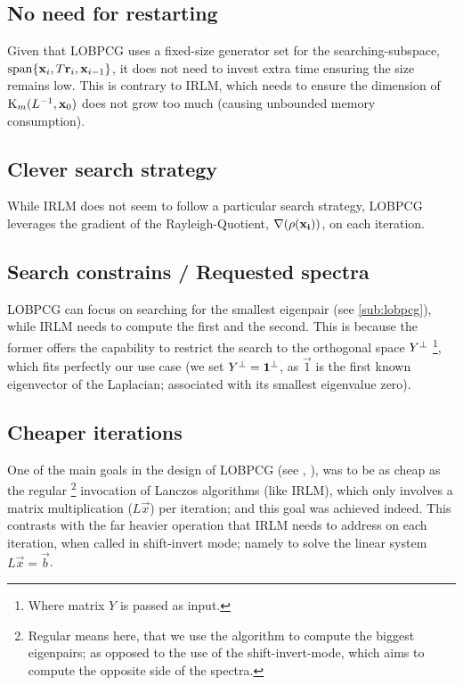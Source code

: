 \subsection{No need for restarting}

Given that \gls{LOBPCG} uses a fixed-size generator set for the
searching-subspace, $\func{span} \{\vec{x}_i, T\vec{r}_i,
\vec{x}_{i-1}\}$, it does not need to invest extra time ensuring the
size remains low. This is contrary to \gls{IRLM}, which needs to
ensure the dimension of $\Krylov{\inv{L}}{\vec{x}_0}{m}$ does not grow
too much (causing unbounded memory consumption).

\subsection{Clever search strategy}

While \gls{IRLM} does not seem to follow a particular search strategy,
\gls{LOBPCG} leverages the gradient of the Rayleigh-Quotient, $\nabla
(\func{\rho}(\vec{x_i}))$, on each iteration.

\subsection{Search constrains / Requested spectra}

\gls{LOBPCG} can focus on searching for the smallest eigenpair (see
\cref{sub:lobpcg}), while \gls{IRLM} needs to compute the first and the
second. This is because the former offers the capability to restrict
the search to the orthogonal space $\ortc{Y}$ \footnote{Where matrix
  $Y$ is passed as input.}, which fits perfectly our use case (we set
$\ortc{Y} = \ortc{\vec{1}}$, as $\vec{1}$ is the first known
eigenvector of the \gls{Laplacian}; associated with its smallest
eigenvalue zero).

\subsection{Cheaper iterations}

One of the main goals in the design of \gls{LOBPCG} (see
\cite{knyazev01}, \cite{knyazev03}),
was to be as cheap as the regular \footnote{Regular means here, that
  we use
  the algorithm to compute the biggest eigenpairs; as opposed to the
  use of the shift-invert-mode, which aims to compute the opposite
  side of the spectra.} invocation of Lanczos
algorithms (like \gls{IRLM}), which only involves a matrix
multiplication ($L\vec{x}$) per iteration; and this goal was achieved
indeed. This contrasts with the far heavier operation that \gls{IRLM}
needs to address on each iteration, when called in shift-invert mode;
namely to solve the linear system $L\vec{x} = \vec{b}$.  


